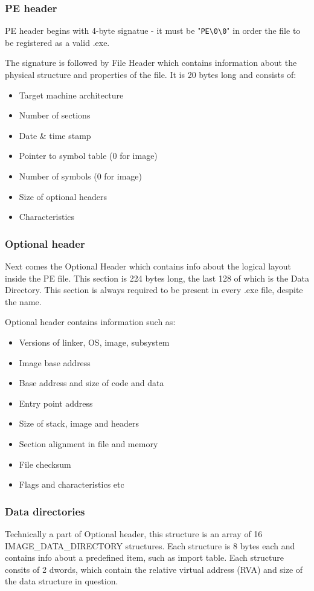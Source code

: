 \documentclass[a4paper,12pt]{article}
\begin{document}
\subsubsection{PE header}
PE header begins with 4-byte signatue - it must be
"\texttt{PE\textbackslash0\textbackslash0}" in order the file to be registered
as a valid .exe.

The signature is followed by File Header which contains information about the
physical structure and properties of the file. It is 20 bytes long and
consists of:

\begin{itemize}
\item Target machine architecture
\item Number of sections
\item Date \& time stamp
\item Pointer to symbol table (0 for image)
\item Number of symbols (0 for image)
\item Size of optional headers
\item Characteristics
\end{itemize}

\subsubsection{Optional header}
Next comes the Optional Header which contains info about the logical layout
inside the PE file. This section is 224 bytes long, the last 128 of which
is the Data Directory. This section is always required to be present in every
.exe file, despite the name.

Optional header contains information such as:

\begin{itemize}
\item Versions of linker, OS, image, subsystem
\item Image base address
\item Base address and size of code and data
\item Entry point address
\item Size of stack, image and headers
\item Section alignment in file and memory
\item File checksum
\item Flags and characteristics etc
\end{itemize}

\subsubsection{Data directories}
Technically a part of Optional header, this structure is an array of 16
IMAGE\_DATA\_DIRECTORY structures. Each structure is 8 bytes each and
contains info about a predefined item, such as import table. Each structure
consits of 2 dwords, which contain the relative virtual address (RVA) and
size of the data structure in question.
\end{document}
